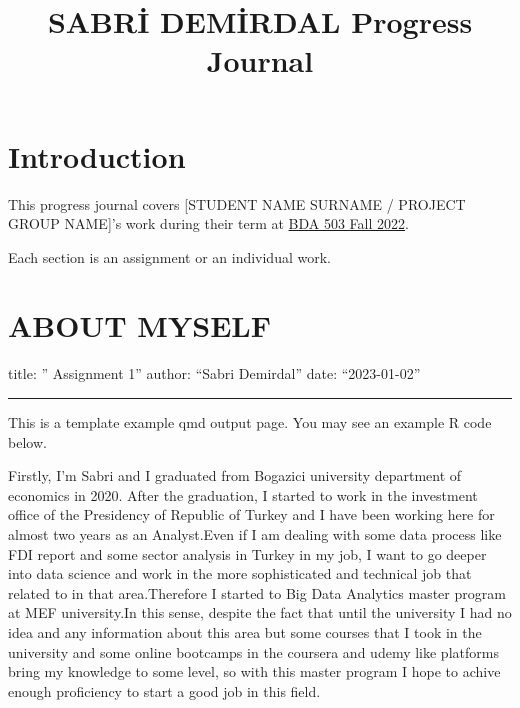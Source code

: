 \documentclass[
  letterpaper,
  DIV=11,
  numbers=noendperiod]{scrreprt}
\title{SABRİ DEMİRDAL Progress Journal}
\author{}
\date{}
\renewcommand*\contentsname{Table of contents}
\newcommand\contentsname{Table of contents}
\begin{document}
\maketitle
\ifdefined\Shaded\renewenvironment{Shaded}{\begin{tcolorbox}[interior hidden, frame hidden, enhanced, breakable, boxrule=0pt, borderline west={3pt}{0pt}{shadecolor}, sharp corners]}{\end{tcolorbox}}\fi

\renewcommand*\contentsname{Table of contents}
{
\hypersetup{linkcolor=}
\setcounter{tocdepth}{2}
\tableofcontents
}

\hypertarget{introduction}{%
\chapter*{Introduction}\label{introduction}}

This progress journal covers {[}STUDENT NAME SURNAME / PROJECT GROUP
NAME{]}'s work during their term at
\href{https://mef-bda503.github.io/fall22/}{BDA 503 Fall 2022}.

Each section is an assignment or an individual work.


\hypertarget{about-myself}{%
\chapter{ABOUT MYSELF}\label{about-myself}}

title: '' Assignment 1'' author: ``Sabri Demirdal'' date: ``2023-01-02''

\begin{center}\rule{0.5\linewidth}{0.5pt}\end{center}

This is a template example qmd output page. You may see an example R
code below.

Firstly, I'm Sabri and I graduated from Bogazici university department
of economics in 2020. After the graduation, I started to work in the
investment office of the Presidency of Republic of Turkey and I have
been working here for almost two years as an Analyst.Even if I am
dealing with some data process like FDI report and some sector analysis
in Turkey in my job, I want to go deeper into data science and work in
the more sophisticated and technical job that related to in that
area.Therefore I started to Big Data Analytics master program at MEF
university.In this sense, despite the fact that until the university I
had no idea and any information about this area but some courses that I
took in the university and some online bootcamps in the coursera and
udemy like platforms bring my knowledge to some level, so with this
master program I hope to achive enough proficiency to start a good job
in this field.
\end{document}
